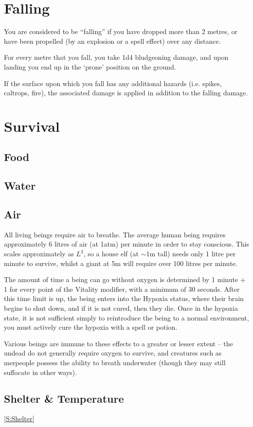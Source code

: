 \section{Falling}

You are considered to be ``falling'' if you have dropped more than 2 metres, or have been propelled (by an explosion or a spell effect) over any distance.  

For every metre that you fall, you take 1d4 bludgeoning damage, and upon landing you end up in the `prone' position on the ground. 

 If the surface upon which you fall has any additional hazards (i.e. spikes, caltrops, fire), the associated damage is applied in addition to the falling damage. 
 
 \section{Survival}\label{S:Survival}


\subsection{Food}
 
 \subsection{Water}
 
\subsection{Air}\label{S:Air}



All living beings require air to breathe. The average human being requires approximately 6 litres of air (at 1atm) per minute in order to stay conscious. This scales approximately as $L^3$, so a house elf (at $\sim$1m tall) needs only 1 litre per minute to survive, whilst a giant at 5m will require over 100 litres per minute. 

The amount of time a being can go without oxygen is determined by 1 minute + 1 for every point of the Vitality modifier, with a minimum of 30 seconds. After this time limit is up, the being enters into the Hypoxia status, where their brain begins to shut down, and if it is not cured, then they die. Once in the hypoxia state, it is not sufficient simply to reintroduce the being to a normal environment, you must actively cure the hypoxia with a spell or potion. 

Various beings are immune to these effects to a greater or lesser extent -- the undead do not generally require oxygen to survive, and creatures such as merpeople possess the ability to breath underwater (though they may still suffocate in other ways). 

\subsection{Shelter \& Temperature} \ref{S:Shelter}
